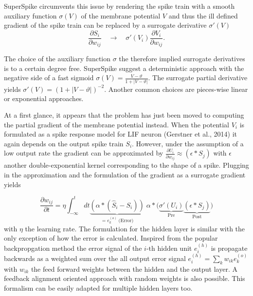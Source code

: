 SuperSpike circumvents this issue by rendering the spike train with a smooth auxiliary function $\sigma(V)$ of the membrane potential $V$ and thus the ill defined gradient of the spike train can be replaced by a surrogate derivative $\sigma'(V)$
\begin{equation}
\frac{\partial S_i}{\partial w_{ij}} \quad \rightarrow \quad \sigma'(V_i)\frac{\partial V_i}{\partial w_{ij}}.
\end{equation}

The choice of the auxiliary function $\sigma$ the therefore implied surrogate derivatives is to a certain degree free. SuperSpike suggest a deterministic approach with the negative side of a fast sigmoid $\sigma(V) = \frac{V - \vartheta}{1 + |V - \vartheta|}$. The surrogate partial derivative yields $\sigma'(V) = \left(1 + |V - \vartheta|\right)^{-2}$. Another common choices are pieces-wise linear or exponential approaches.

At a first glance, it appears that the problem has just been moved to computing the partial gradient of the membrane potential instead. When the potential $V_i$ is formulated as a spike response model for LIF neuron (Gerstner et al., 2014) it again depends on the output spike train $S_i$. However, under the assumption of a low output rate the gradient can be approximated by $\frac{\partial U_i}{\partial w_{ij}} \approx (\epsilon \ast S_j)$ with $\epsilon$ another double-exponential kernel corresponding to the shape of a spike. Plugging in the approximation and the formulation of the gradient as a surrogate gradient yields

\begin{equation}
\frac{\partial w_{ij}}{\partial t} = \eta \int_{-\infty}^{t} dt
\underbrace{\left(\alpha \ast (\hat{S}_i - S_i)\right)}_{= e^{(o)}_k \; \text{(Error)}} 
\; \alpha \ast 
\Big(\underbrace{\sigma'(U_i)}_{\text{Pre}} 
\underbrace{\left(\epsilon \ast S_j\right)}_{\text{Post}}\Big)
\end{equation}
with $\eta$ the learning rate. The formulation for the hidden layer is similar with the only exception of how the error is calculated. Inspired from the popular backpropgation method the error signal of the $i \text{-th}$ hidden unit $e^{(h)}_i$ is propagate backwards as a weighted sum over the all output error signal $e^{(h)}_i = \sum_{k} w_{ik} e^{(o)}_k$ with $w_{ik}$ the feed forward weights between the hidden and the output layer. A feedback alignment oriented approach with random weights is also possible. This formalism can be easily adapted for multiple hidden layers too.


